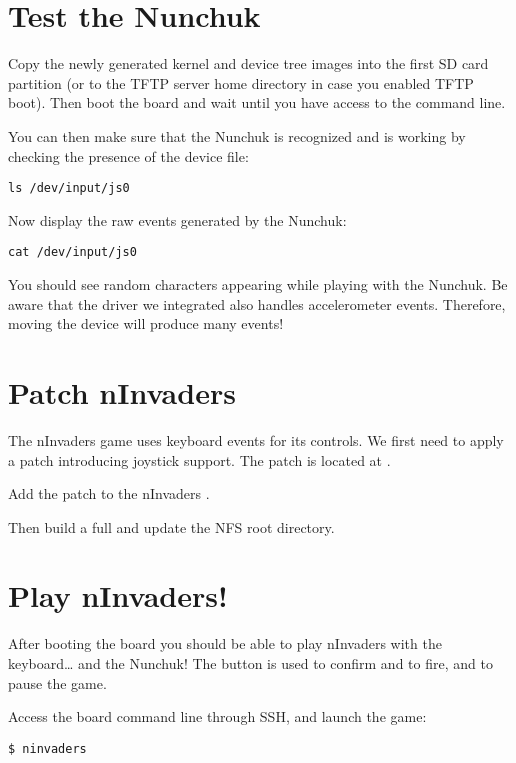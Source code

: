 \section{Test the Nunchuk}

Copy the newly generated kernel and device tree images into the first SD card
partition (or to the TFTP server home directory in case you enabled TFTP
boot). Then boot the board and wait until you have access to the
 command line.

You can then make sure that the Nunchuk is recognized and is working by
checking the presence of the  device file:
\begin{verbatim}
ls /dev/input/js0
\end{verbatim}

Now display the raw events generated by the Nunchuk:
\begin{verbatim}
cat /dev/input/js0
\end{verbatim}

You should see random characters appearing while playing with the Nunchuk. Be
aware that the driver we integrated also handles accelerometer events. Therefore,
moving the device will produce many events!

\section{Patch nInvaders}

The nInvaders game uses keyboard events for its controls. We first need to apply
a patch introducing joystick support. The patch is located at
.

Add the patch to the nInvaders .

Then build a full  and update the NFS root
directory.

\section{Play nInvaders!}

After booting the board you should be able to play nInvaders with the
keyboard\dots{} and the Nunchuk! The  button is used to confirm and to
fire, and  to pause the game.

Access the board command line through SSH, and launch the game:
\begin{verbatim}
$ ninvaders
\end{verbatim}
